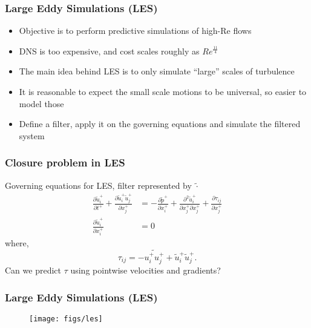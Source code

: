 \documentclass[aspectratio=169]{beamer}
\newcommand{\ot}[1]{\widetilde{#1}}
\newcommand{\otu}{\widetilde{u}}
\newcommand{\otp}{\widetilde{p}}
\begin{document}
\begin{frame}
    \frametitle{Large Eddy Simulations (LES)}
    \begin{itemize}
        \item Objective is to perform predictive simulations of high-Re flows
        \item DNS is too expensive, and cost scales roughly as $Re^{\frac{11}{4}}$
        \item The main idea behind LES is to only simulate ``large'' scales of turbulence
        \item It is reasonable to expect the small scale motions to be universal, so easier to model those
        \item Define a filter, apply it on the governing equations and simulate the filtered system
    \end{itemize}
\end{frame}
\begin{frame}
    \frametitle{Closure problem in LES}
    Governing equations for LES, filter represented by $\ot{\cdot}$
    \begin{align}
    \frac{\partial \otu^+_i}{\partial t^+}+\frac{\partial \otu^+_i\ot u^+_j}{\partial
      x^+_j}&=-\frac{\partial \otp^+}{\partial x^+_i}+\frac{\partial^2 \otu^+_i}{\partial
      x^+_j\partial x^+_j}+\frac{\partial \tau_{ij}}{\partial x^+_j}\\
    \frac{\partial \ot u^+_i}{\partial x^+_i}&=0
\end{align}
where,
\begin{equation}
\tau_{ij}=-\ot{u^+_iu^+_j}+\otu^+_i\otu^+_j.
\end{equation}
Can we predict $\tau$ using pointwise velocities and gradients?
\end{frame}
\begin{frame}
    \frametitle{Large Eddy Simulations (LES)}
    \begin{figure}
        \centering
        \texttt{[image: figs/les]}
    \end{figure}
\end{frame}
\end{document}
